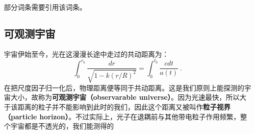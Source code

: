 
\begin{issues}
\issueTODO
部分词条需要引用该词条。
\end{issues}

\subsection{可观测宇宙}
宇宙伊始至今，光在这漫漫长途中走过的共动距离为：
\begin{equation}
\int_{0}^{r_{0}} \frac{d r}{\sqrt{1-k (r/R)^{2}}}=\int_{0}^{t_{0}} \frac{c d t}{a(t)}~.
\end{equation}
在把尺度因子归一化后，物理距离便等同于共动距离。这是我们原则上能探测的宇宙大小，故称为\textbf{可观测宇宙（observarable universe）}。因为光速最快，所以大于该距离的粒子并不能影响到此时的我们，因此这个距离又被叫作\textbf{粒子视界（particle horizon）}。不过实际上，光子在退耦前与其他带电粒子作用频繁，整个宇宙都是不透光的，我们能测得的
